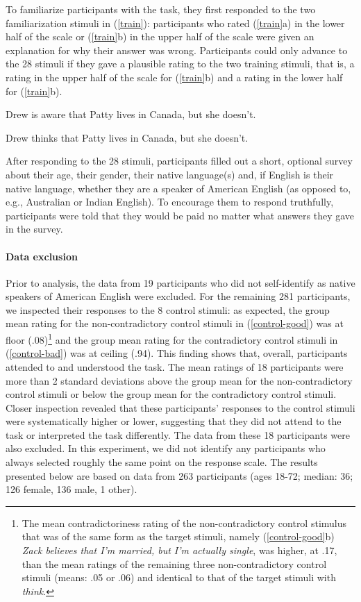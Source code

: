 \documentclass[11pt,fleqn]{article}
\newcommand{\6}{\mbox{$[\hspace*{-.6mm}[$}}
\newcommand{\9}{\mbox{$]\hspace*{-.6mm}]$}}
\begin{document}
{To familiarize participants with the task, they first responded to the two familiarization stimuli in (\ref{train}): participants who rated (\ref{train}a) in the lower half of the scale or (\ref{train}b) in the upper half of the scale were given an explanation for why their answer was wrong. Participants could only advance to the 28 stimuli if they gave a plausible rating to the two training stimuli, that is, a rating in the upper half of the scale for (\ref{train}b) and a rating in the lower half for (\ref{train}b).

\begin{exe}
\ex\label{train}
\begin{xlist}
\ex Drew is aware that Patty lives in Canada, but she doesn't.

\ex Drew thinks that Patty lives in Canada, but she doesn't.
\end{xlist}
\end{exe}

After responding to the 28 stimuli, participants filled out a short, optional survey about their age, their gender, their native language(s) and, if English is their native language, whether they are a speaker of American English (as opposed to, e.g., Australian or Indian English). To encourage them to respond truthfully, participants were told that they would be paid no matter what answers they gave in the survey.

\paragraph{Data exclusion}

Prior to analysis, the data from 19 participants who did not self-identify as native speakers of American English were excluded. For the remaining 281 participants, we inspected their responses to the 8 control stimuli: as expected, the group mean rating for the non-contradictory control stimuli in (\ref{control-good}) was at floor (.08)\footnote{The mean contradictoriness rating of the non-contradictory control stimulus that was of the same form as the target stimuli, namely (\ref{control-good}b) {\em Zack believes that I'm married, but I'm actually single}, was higher, at .17, than the mean ratings of the remaining three non-contradictory control stimuli (means: .05 or .06) and identical to that of the target stimuli with {\em think}.}  and the group mean rating for the contradictory control stimuli in (\ref{control-bad}) was at ceiling (.94). This finding shows that, overall, participants attended to and understood the task. The mean ratings of 18 participants were more than 2 standard deviations above the group mean for the non-contradictory control stimuli or below the group mean for the contradictory control stimuli. Closer inspection revealed that these participants' responses to the control stimuli were systematically higher or lower, suggesting that they did not attend to the task or interpreted the task differently. The data from these 18 participants were also excluded. In this experiment, we did not identify any participants who always selected roughly the same point on the response scale. The results presented below are based on data from 263 participants (ages 18-72; median: 36; 126 female, 136 male, 1 other).

}
\end{document}
